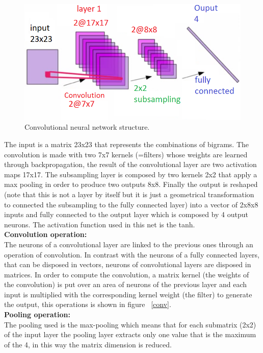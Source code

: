 \documentclass[a4paper, 10pt, conference]{ieeeconf}      %
\begin{document}
\begin{figure}[thpb]
	\centering
	\includegraphics[scale=0.45]{cnn.png}
	\caption{Convolutional neural network structure.}
	\label{cnnNet}
\end{figure}
The input is a matrix 23x23 that represents the combinations of bigrams. The convolution is made with two 7x7 kernels (=filters) whose weights are learned through backpropagation, the result of the convolutional layer are two activation maps 17x17.
The subsampling layer is composed by two kernels 2x2 that apply a max pooling in order to produce two outputs 8x8. Finally the output is reshaped (note that this
is not a layer by itself but it is just a geometrical
transformation to connected the subsampling to
the fully connected layer) into a vector of 2x8x8 inputs and fully connected to the output layer which is composed by 4 output neurons. The activation function used in this net is the tanh.\\
\textbf{Convolution operation:}\\
The neurons of a convolutional layer are linked
to the previous ones through an operation of
convolution. In contrast with the neurons of a fully
connected layers, that can be disposed in vectors,
neurons of convolutional layers are disposed in
matrices. In order to compute the convolution,
a matrix kernel (the weights of the convolution)
is put over an area of neurons of the previous
layer and each input is multiplied with the corresponding
kernel weight (the filter) to generate the
output, this operations is shown in figure  ~\ref{conv}.\\
\textbf{Pooling operation:}\\ The pooling used is the
max-pooling which means that for each submatrix
(2x2) of the input layer the pooling layer extracts
only one value that is the maximum of the 4, in
this way the matrix dimension is reduced.\\
\end{document}
